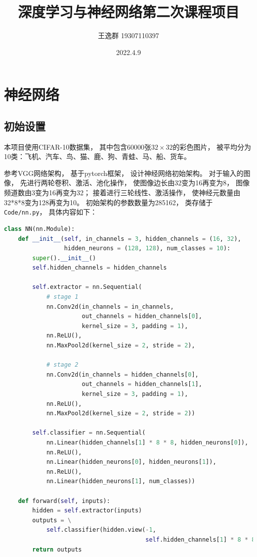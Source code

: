 \documentclass{article}
\title{深度学习与神经网络第二次课程项目}
\author{王逸群 19307110397}
\date{2022.4.9}
\begin{document}
	
\maketitle

\section{神经网络}

\subsection{初始设置}

本项目使用CIFAR-10数据集，
其中包含60000张$32\times32$的彩色图片，
被平均分为10类：飞机、汽车、鸟、猫、鹿、狗、青蛙、马、船、货车。

参考VGG网络架构，
基于pytorch框架，
设计神经网络初始架构。
对于输入的图像，
先进行两轮卷积、激活、池化操作，
使图像边长由32变为16再变为8，
图像频道数由3变为16再变为32；
接着进行三轮线性、激活操作，
使神经元数量由32*8*8变为128再变为10。
初始架构的参数数量为285162，
类存储于\verb|Code/nn.py|，
具体内容如下：

\begin{lstlisting}[language=Python]
class NN(nn.Module):
    def __init__(self, in_channels = 3, hidden_channels = (16, 32), 
                 hidden_neurons = (128, 128), num_classes = 10):
        super().__init__()
        self.hidden_channels = hidden_channels

        self.extractor = nn.Sequential(
            # stage 1
            nn.Conv2d(in_channels = in_channels,
                      out_channels = hidden_channels[0],
                      kernel_size = 3, padding = 1),
            nn.ReLU(),
            nn.MaxPool2d(kernel_size = 2, stride = 2),

            # stage 2
            nn.Conv2d(in_channels = hidden_channels[0],
                      out_channels = hidden_channels[1],
                      kernel_size = 3, padding = 1),
            nn.ReLU(),
            nn.MaxPool2d(kernel_size = 2, stride = 2))

        self.classifier = nn.Sequential(
            nn.Linear(hidden_channels[1] * 8 * 8, hidden_neurons[0]),
            nn.ReLU(),
            nn.Linear(hidden_neurons[0], hidden_neurons[1]),
            nn.ReLU(),
            nn.Linear(hidden_neurons[1], num_classes))

    def forward(self, inputs):
        hidden = self.extractor(inputs)
        outputs = \
            self.classifier(hidden.view(-1,
                                        self.hidden_channels[1] * 8 * 8))
        return outputs
\end{lstlisting}
\end{document}
